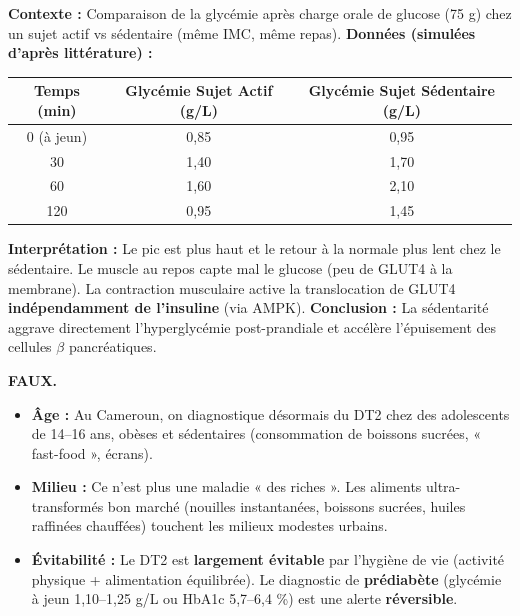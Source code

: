 \documentclass[11pt]{article}
\begin{document}
\begin{experience}
\textbf{Contexte :} Comparaison de la glycémie après charge orale de glucose (75 g) chez un sujet actif vs sédentaire (même IMC, même repas).
\textbf{Données (simulées d'après littérature) :}
\begin{center}
\begin{tabular}{|c|c|c|}\hline
Temps (min) & Glycémie Sujet Actif (g/L) & Glycémie Sujet Sédentaire (g/L) \\ \hline
0 (à jeun) & 0,85 & 0,95 \\ \hline
30 & 1,40 & 1,70 \\ \hline
60 & 1,60 & 2,10 \\ \hline
120 & 0,95 & 1,45 \\ \hline
\end{tabular}
\end{center}
\textbf{Interprétation :} Le pic est plus haut et le retour à la normale plus lent chez le sédentaire. Le muscle au repos capte mal le glucose (peu de GLUT4 à la membrane). La contraction musculaire active la translocation de GLUT4 \textbf{indépendamment de l'insuline} (via AMPK).
\textbf{Conclusion :} La sédentarité aggrave directement l'hyperglycémie post-prandiale et accélère l'épuisement des cellules $\beta$ pancréatiques.
\end{experience}

\begin{attention}
\textbf{FAUX.}
\begin{itemize}
    \item \textbf{Âge :} Au Cameroun, on diagnostique désormais du DT2 chez des adolescents de 14--16 ans, obèses et sédentaires (consommation de boissons sucrées, « fast-food », écrans).
    \item \textbf{Milieu :} Ce n'est plus une maladie « des riches ». Les aliments ultra-transformés bon marché (nouilles instantanées, boissons sucrées, huiles raffinées chauffées) touchent les milieux modestes urbains.
    \item \textbf{Évitabilité :} Le DT2 est \textbf{largement évitable} par l'hygiène de vie (activité physique + alimentation équilibrée). Le diagnostic de \textbf{prédiabète} (glycémie à jeun 1,10--1,25 g/L ou HbA1c 5,7--6,4 \%) est une alerte \textbf{réversible}.
\end{itemize}
\end{attention}
\end{document}
